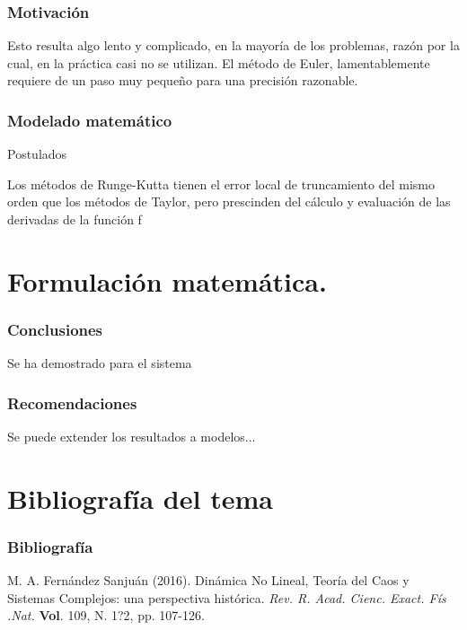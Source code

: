 \documentclass{beamer}
\begin{document}
\begin{frame}
\frametitle{Motivaci\'on}
\begin{minipage}{10cm}
Esto resulta algo lento y complicado, en la mayor\'ia de los problemas, raz\'on por la cual, en la pr\'actica casi no se utilizan. El m\'etodo de Euler, lamentablemente requiere de un paso muy pequeño para una precisi\'on razonable. 
\end{minipage}
\end{frame}	

\begin{frame}
	\frametitle{Modelado matem\'atico }
\begin{alertblock}{\begin{dinglist}{45}
			\item Postulados
	\end{dinglist}}
    \begin{minipage}{10cm}
	Los m\'etodos de Runge-Kutta tienen el error local de truncamiento del mismo orden que los m\'etodos de Taylor, pero prescinden del c\'alculo y evaluaci\'on de las derivadas de la funci\'on f
     \end{minipage}
\end{alertblock}
\end{frame}

\section{Formulaci\'on matem\'atica.}
\begin{frame}
	\frametitle{Conclusiones}
	\begin{minipage}{10cm}
	Se ha demostrado para el sistema 
	\end{minipage}
\end{frame}

\begin{frame}
	\frametitle{Recomendaciones}
	\begin{minipage}{10cm}
		Se puede extender los resultados a modelos... 
	\end{minipage}
\end{frame}
\section{Bibliograf\'ia del tema}
\begin{frame}
\frametitle{Bibliograf\'ia}
\begin{thebibliography}{99}

 M. A. Fern\'andez Sanju\'an (2016). Din\'amica No Lineal, Teor\'ia del Caos y Sistemas Complejos: una perspectiva hist\'orica. {\em Rev. R. Acad. Cienc. Exact. F\'is .Nat.} \textbf{Vol}. 109, N. 1?2, pp. 107-126.
\end{thebibliography}	
\end{frame}
\end{document}
